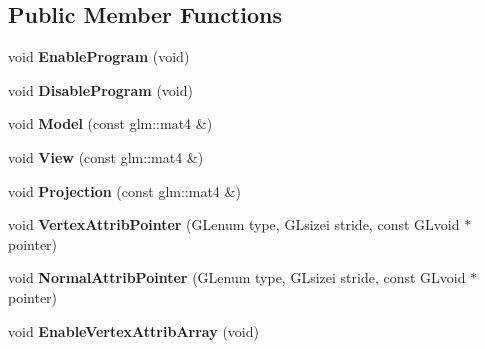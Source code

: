 \subsection*{\-Public \-Member \-Functions}
\begin{DoxyCompactItemize}
\item 
\hypertarget{classChunkShaderPicking_a27218004043cc389e40489db791c4f9f}{void {\bfseries \-Enable\-Program} (void)}\label{classChunkShaderPicking_a27218004043cc389e40489db791c4f9f}

\item 
\hypertarget{classChunkShaderPicking_a71e05eac6b9a07f30520a34a8841c0e4}{void {\bfseries \-Disable\-Program} (void)}\label{classChunkShaderPicking_a71e05eac6b9a07f30520a34a8841c0e4}

\item 
\hypertarget{classChunkShaderPicking_ae8115eb6eb1bb3537b743b67d8ca91e9}{void {\bfseries \-Model} (const glm\-::mat4 \&)}\label{classChunkShaderPicking_ae8115eb6eb1bb3537b743b67d8ca91e9}

\item 
\hypertarget{classChunkShaderPicking_a04d783cbb2b3efe1410cbe0e28d9977c}{void {\bfseries \-View} (const glm\-::mat4 \&)}\label{classChunkShaderPicking_a04d783cbb2b3efe1410cbe0e28d9977c}

\item 
\hypertarget{classChunkShaderPicking_ac8fcf8b492ea4e3b77931d66af664a57}{void {\bfseries \-Projection} (const glm\-::mat4 \&)}\label{classChunkShaderPicking_ac8fcf8b492ea4e3b77931d66af664a57}

\item 
\hypertarget{classChunkShaderPicking_a645e65c52d1a5fdc770eef02acebd545}{void {\bfseries \-Vertex\-Attrib\-Pointer} (\-G\-Lenum type, \-G\-Lsizei stride, const \-G\-Lvoid $\ast$pointer)}\label{classChunkShaderPicking_a645e65c52d1a5fdc770eef02acebd545}

\item 
\hypertarget{classChunkShaderPicking_af2ff798f612ebf3ab9010de6d92d5ee1}{void {\bfseries \-Normal\-Attrib\-Pointer} (\-G\-Lenum type, \-G\-Lsizei stride, const \-G\-Lvoid $\ast$pointer)}\label{classChunkShaderPicking_af2ff798f612ebf3ab9010de6d92d5ee1}

\item 
\hypertarget{classChunkShaderPicking_a1b0a8cef7f4c8cb7b06153caedeba1b3}{void {\bfseries \-Enable\-Vertex\-Attrib\-Array} (void)}\label{classChunkShaderPicking_a1b0a8cef7f4c8cb7b06153caedeba1b3}

\end{DoxyCompactItemize}
